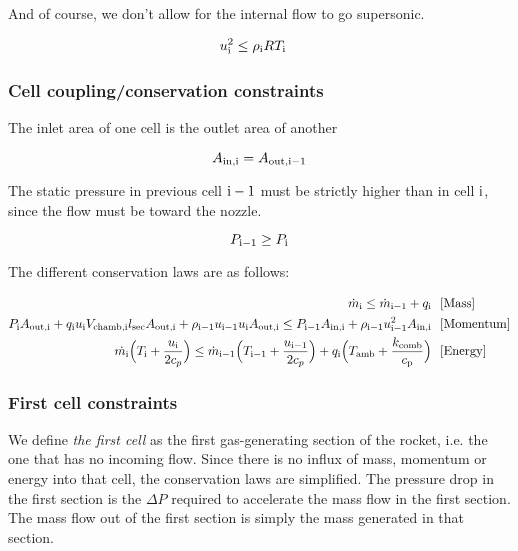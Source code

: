And of course, we don't allow for the internal flow to go supersonic.

\begin{align}
    u_{\rm{i}}^2 &\leq \rho_{\rm{i}} R T_{\rm{i}}
\end{align}

\subsubsection{Cell coupling/conservation constraints}

The inlet area of one cell is the outlet area of another

\begin{equation}
    A_{\rm{in}, \rm{i}} = A_{\rm{out}, \rm{i}-1}
\end{equation}

The static pressure in previous cell $\rm{i}-1$ must be strictly higher
than in cell $\rm{i}$, since the flow must be toward the nozzle.

\begin{equation}
    P_{\rm{i}-1} \geq P_{\rm{i}}
\end{equation}

The different conservation laws are as follows:

\begin{align}
    \dot{m}_{\rm{i}}
    \leq
    \dot{m}_{\rm{i}-1} + q_{\rm{i}} ~~&\rm{[Mass]}\\
    P_{\rm{i}} A_{\rm{out}, \rm{i}} + q_{\rm{i}} u_{\rm{i}} V_{\rm{chamb},\rm{i}} l_{\rm{sec}} A_{\rm{out},\rm{i}}
    + \rho_{\rm{i}-1} u_{\rm{i}-1} u_{\rm{i}} A_{\rm{out}, \rm{i}}
    \leq
    P_{\rm{i}-1} A_{\rm{in}, \rm{i}} + \rho_{\rm{i}-1} u_{\rm{i}-1}^2 A_{\rm{in},\rm{i}} ~~&[\mathrm{Momentum}]\\
    \dot{m_{\rm{i}}} \Big(T_{\rm{i}} + \frac{u_{\rm{i}}}{2c_p}\Big)
    \leq
    \dot{m}_{\rm{i}-1} \Big(T_{\rm{i}-1} + \frac{u_{\rm{i}-1}}{2c_p}\Big) +
    q_{\rm{i}}\Big(T_{\rm{amb}} + \frac{k_{\rm{comb}}}{c_{\rm{p}}}\Big) ~~&\rm{[Energy]}\\
\end{align}

\subsubsection{First cell constraints}

We define \textit{the first cell} as the first gas-generating section
of the rocket, i.e. the one that has no incoming flow.
Since there is no influx of mass, momentum or energy into that cell,
the conservation laws are simplified.
The pressure drop in the first section is the $\Delta P$ required
to accelerate the mass flow in the first section. The mass flow out of
the first section is simply the mass generated in that section.

